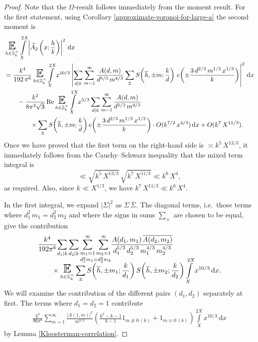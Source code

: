 \documentclass[a4paper,10pt,twoside]{amsart}
\theoremstyle{definition}
\numberwithin{equation}{section}
\newcommand\E{\mathbb{E}}
\renewcommand{\Re}{\textnormal{Re}}
\renewcommand\:{\colon}
\begin{document}
\begin{proof}
Note that the $\Omega$-result follows immediately from the moment result. For the first statement, using Corollary \ref{approximate-voronoi-for-large-a} the second moment is
\begin{align*}
&\mathop{\text{\LARGE$\E$}}_{h\in\mathbb Z_k^\times}\int\limits_X^{2X}\left|\widetilde A_2\left(x;\frac hk\right)\right|^2\,\mathrm dx\\
&=\frac{k^4}{192\,\pi^6}\mathop{\text{\LARGE$\E$}}_{h\in\mathbb Z_k^\times}\int\limits_X^{2X}x^{10/3}\left|\sum_{d\mid k}\sum_{m=1}^\infty\frac{A(d,m)}{d^{5/3}\,m^{4/3}}\sum_\pm S\!\left(\overline h,\pm m;\frac kd\right)\,e\!\left(\pm\frac{3\,d^{2/3}\,m^{1/3}\,x^{1/3}}k\right)\right|^2\,\mathrm dx\\
&\qquad-\frac{k^2}{8\pi^3\sqrt 3}\,\Re\mathop{\text{\LARGE$\E$}}_{h\in\mathbb Z_k^\times}\int\limits_X^{2X}x^{5/3}\sum_{d\mid k}\sum_{m=1}^\infty\frac{A(d,m)}{d^{5/3}\,m^{4/3}}\\&\hspace*{4em}\times\sum_\pm S\!\left(\overline h,\pm m;\frac kd\right)e\!\left(\pm\frac{3\,d^{2/3}\,m^{1/3}\,x^{1/3}}k\right)
\cdot O(k^{7/2}\,x^{4/3})\,\mathrm dx+O(k^{7}\,X^{11/3}).
\end{align*}
Once we have proved that the first term on the right-hand side is $\asymp k^{5}\,X^{13/3}$, it immediately follows from the Cauchy--Schwarz inequality that the mixed term integral is
\[\ll\sqrt{k^{5}\,X^{13/3}}\,\sqrt{k^{7}\,X^{11/3}}\ll k^{6}\,X^{4},\] as required. Also, since $k\ll X^{1/3}$, we have $k^{7}\,X^{11/3}\ll k^{6}\,X^4$.

In the first integral, we expand $\left|\Sigma\right|^2$ as $\Sigma\,\overline\Sigma$. The diagonal terms, i.e.\ those terms where $d_1^2\,m_1=d_2^2\,m_2$ and where the signs in sums $\sum_\pm$ are chosen to be equal, give the contribution
\begin{align*}
&\frac{k^4}{192\pi^6}\smash{\sum_{d_1\mid k}\sum_{d_2\mid k}\underset{d_1^2m_1=d_2^2m_2}{\sum_{m_1=1}^\infty\sum_{m_2=1}^\infty}}
\frac{A(d_1,m_1)\,\overline{A(d_2,m_2)}}{d_1^{5/3}\,d_2^{5/3}\,m_1^{4/3}\,m_2^{4/3}}\\
&\qquad\times\mathop{\text{\LARGE$\E$}}_{h\in\mathbb Z_k^\times}\sum_\pm S\!\left(\overline h,\pm m_1;\frac k{d_1}\right)S\!\left(\overline h,\pm m_2;\frac k{d_2}\right)
\int\limits_X^{2X}x^{10/3}\,\mathrm dx.     
\end{align*}
We will examine the contribution of the different pairs $(d_1,d_2)$ separately at first. The terms where $d_1=d_2=1$ contribute
\begin{align}\label{contribution1}
\frac{k^4}{96\pi^6}\sum_{m=1}^\infty\frac{\left|A(1,m)\right|^2}{m^{8/3}}\left(\frac{k^2-k-1}{k-1}1_{m\not\equiv 0\,(k)}+1_{m\equiv 0\,(k)}\right)\int\limits_X^{2X}x^{10/3}\,\mathrm dx
\end{align}
by Lemma \ref{Kloosterman-correlation}.


\end{proof}
\end{document}
